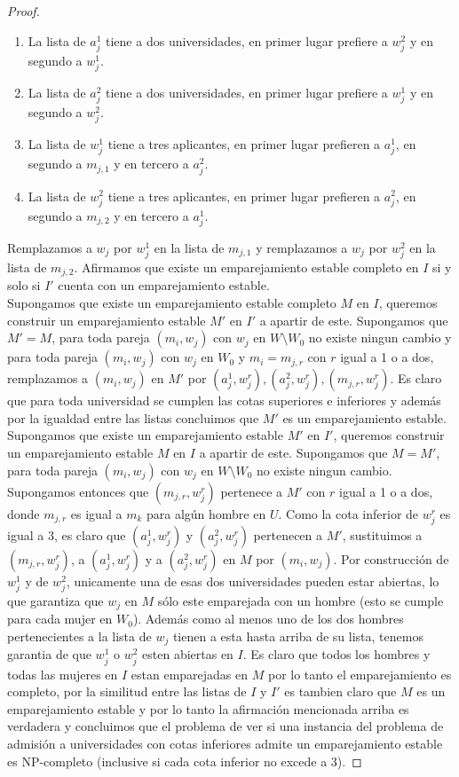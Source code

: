 \begin{proof}
\begin{enumerate}
\item La lista de $a_j^1$ tiene a dos universidades, en primer lugar prefiere a $w_j^2$ y en segundo a $w_j^1$.
\item La lista de $a_j^2$ tiene a dos universidades, en primer lugar prefiere a $w_j^1$ y en segundo a $w_j^2$.
\item La lista de $w_j^1$ tiene a tres aplicantes, en primer lugar prefieren a $a_j^1$, en segundo a $m_{j,1}$ y en tercero a $a_j^2$.
\item La lista de $w_j^2$ tiene a tres aplicantes, en primer lugar prefieren a $a_j^2$, en segundo a $m_{j,2}$ y en tercero a $a_j^1$.
\end{enumerate}
Remplazamos a $w_j$ por $w_j^1$ en la lista de $m_{j,1}$ y remplazamos a $w_j$ por $w_j^2$ en la lista de $m_{j,2}$. Afirmamos que existe un emparejamiento estable completo en $I$ si y solo si $I'$ cuenta con un emparejamiento estable.  \\
Supongamos que existe un emparejamiento estable completo $M$ en $I$, queremos construir un emparejamiento estable $M'$ en $I'$ a apartir de este. Supongamos que $M'=M$, para toda pareja $(m_i,w_j)$ con $w_j$ en $W\setminus W_0$ no existe ningun cambio y para toda pareja $(m_i,w_j)$ con $w_j$ en $W_0$ y $m_i=m_{j,r}$ con $r$ igual a 1 o a dos, remplazamos a  $(m_i,w_j)$ en $M'$ por $(a_j^1,w_j^r), (a_j^2,w_j^r),(m_{j,r}, w_j^r)$. Es claro que para toda universidad se cumplen las cotas superiores e inferiores y además por la igualdad entre las listas concluimos que $M'$ es un emparejamiento estable. \\
Supongamos que existe un emparejamiento estable $M'$ en $I'$, queremos construir un emparejamiento estable $M$ en $I$ a apartir de este. Supongamos que $M=M'$, para toda pareja $(m_i,w_j)$ con $w_j$ en $W\setminus W_0$ no existe ningun cambio. Supongamos entonces que $(m_{j,r}, w_{j}^{r})$ pertenece a $M'$ con $r$ igual a 1 o a dos, donde $m_{j,r}$ es igual a $m_k$ para algún hombre en $U$. Como la cota inferior de $w_{j}^{r}$ es igual a 3, es claro que $(a_j^1,w_{j}^{r})$ y  $(a_j^2,w_{j}^{r})$ pertenecen a $M'$, sustituimos a $(m_{j,r}, w_{j}^{r})$, a $(a_j^1,w_{j}^{r})$ y  a $(a_j^2,w_{j}^{r})$ en $M$ por $(m_i,w_j)$. Por construcción de $w_j^1$ y de $w_j^2$, unicamente una de esas dos universidades pueden estar abiertas, lo que garantiza que $w_j$ en $M$ sólo este emparejada con un hombre (esto se cumple para cada mujer en $W_0$). Además como al menos uno de los dos hombres pertenecientes a la lista de  $w_j$ tienen a esta hasta arriba de su lista, tenemos garantia de que $w_j^1$ o  $w_j^2$ esten abiertas en $I$. Es claro que todos los hombres y todas las mujeres en $I$ estan emparejadas en $M$ por lo tanto el emparejamiento es completo, por la similitud entre las listas de $I$ y $I'$ es tambien claro que $M$ es un emparejamiento estable y por lo tanto la afirmación mencionada arriba es verdadera y concluimos que el problema de ver si una instancia del problema de admisión a universidades con cotas inferiores admite un emparejamiento estable es NP-completo (inclusive si cada cota inferior no excede a 3).
\end{proof}


